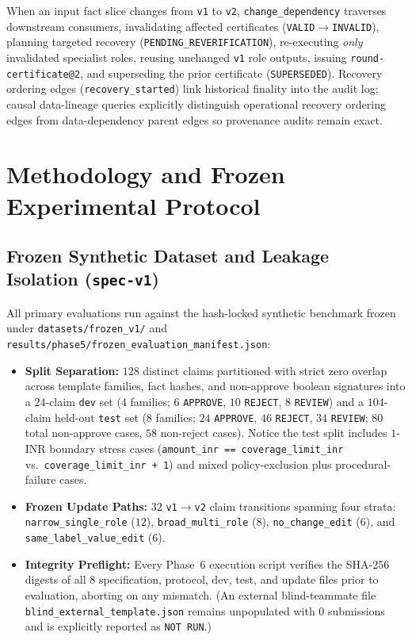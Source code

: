 \documentclass[11pt,a4paper]{article}
\begin{document}
When an input fact slice changes from \texttt{v1} to \texttt{v2}, \texttt{change\_dependency} traverses downstream consumers, invalidating affected certificates (\texttt{VALID}$\rightarrow$\texttt{INVALID}), planning targeted recovery (\texttt{PENDING\_REVERIFICATION}), re-executing \emph{only} invalidated specialist roles, reusing unchanged \texttt{v1} role outputs, issuing \texttt{round-certificate@2}, and superseding the prior certificate (\texttt{SUPERSEDED}). Recovery ordering edges (\texttt{recovery\_started}) link historical finality into the audit log; causal data-lineage queries explicitly distinguish operational recovery ordering edges from data-dependency parent edges so provenance audits remain exact.

\section{Methodology and Frozen Experimental Protocol}

\subsection{Frozen Synthetic Dataset and Leakage Isolation (\texttt{spec-v1})}
All primary evaluations run against the hash-locked synthetic benchmark frozen under \texttt{datasets/frozen\_v1/} and \texttt{results/phase5/frozen\_evaluation\_manifest.json}:
\begin{itemize}[leftmargin=*,itemsep=2pt]
    \item \textbf{Split Separation:} $128$ distinct claims partitioned with strict zero overlap across template families, fact hashes, and non-approve boolean signatures into a $24$-claim \texttt{dev} set ($4$ families; $6$ \texttt{APPROVE}, $10$ \texttt{REJECT}, $8$ \texttt{REVIEW}) and a $104$-claim held-out \texttt{test} set ($8$ families; $24$ \texttt{APPROVE}, $46$ \texttt{REJECT}, $34$ \texttt{REVIEW}; $80$ total non-approve cases, $58$ non-reject cases). Notice the test split includes $1$-INR boundary stress cases (\texttt{amount\_inr == coverage\_limit\_inr} vs.\ \texttt{coverage\_limit\_inr + 1}) and mixed policy-exclusion plus procedural-failure cases.
    \item \textbf{Frozen Update Paths:} $32$ \texttt{v1}$\rightarrow$\texttt{v2} claim transitions spanning four strata: \texttt{narrow\_single\_role} ($12$), \texttt{broad\_multi\_role} ($8$), \texttt{no\_change\_edit} ($6$), and \texttt{same\_label\_value\_edit} ($6$).
    \item \textbf{Integrity Preflight:} Every Phase~6 execution script verifies the SHA-256 digests of all $8$ specification, protocol, dev, test, and update files prior to evaluation, aborting on any mismatch. (An external blind-teammate file \texttt{blind\_external\_template.json} remains unpopulated with $0$ submissions and is explicitly reported as \texttt{NOT RUN}.)
\end{itemize}
\end{document}
